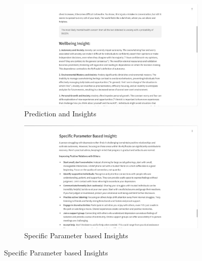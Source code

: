 \begin{figure}[H]
    \centering
    \begin{subfigure}[b]{0.495\textwidth}
        \centering
        \includegraphics[width=\textwidth]{App Images/03 Interface.png}
        \caption{Prediction and Insights}
        \label{fig:euclidean_distance}
    \end{subfigure}
    \hfill
    \begin{subfigure}[b]{0.495\textwidth}
        \centering
        \includegraphics[width=\textwidth]{App Images/25 Interface.png}
        \caption{Specific Parameter based Insights}
        \label{fig:specific_insights}
    \end{subfigure}
    
    \vspace{1em}


\end{figure}

